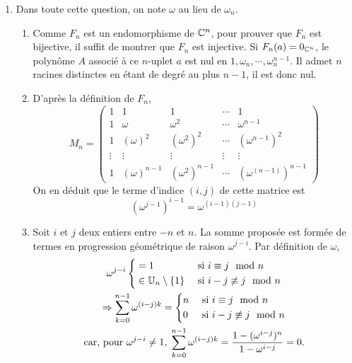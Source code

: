 \begin{enumerate}
 \item Dans toute cette question, on note $\omega$ au lieu de $\omega_n$.
\begin{enumerate}
 \item Comme $F_n$ est un endomorphisme de $\mathbb{C}^n$, pour prouver que $F_n$ est bijective, il suffit de montrer que $F_n$ est injective.\newline
Si $F_n(a)=0_{\mathbb{C}^n}$, le polynôme $A$ associé à ce $n$-uplet $a$ est nul en $1,\omega_n,\cdots,\omega_n^{n-1}$. Il admet $n$ racines distinctes en étant de degré au plus $n-1$, il est donc nul.
 \item D'après la définition de $F_n$,
\begin{displaymath}
 M_n=
\begin{pmatrix}
 1      & 1              & 1                & \cdots & 1                     \\
 1      & \omega         & \omega^2         & \cdots & \omega^{n-1}          \\
 1      & (\omega)^2     & (\omega^2)^2     & \cdots & (\omega^{n-1})^2      \\
 \vdots & \vdots         &  \vdots          & \vdots &  \vdots               \\
 1      & (\omega)^{n-1} & (\omega^2)^{n-1} & \cdots & (\omega^{(n-1)})^{n-1}
\end{pmatrix}
\end{displaymath}
On en déduit que le terme d'indice $(i,j)$ de cette matrice est
\begin{displaymath}
 (\omega^{j-1})^{i-1}=\omega^{(i-1)(j-1)}
\end{displaymath}

 \item Soit $i$ et $j$ deux entiers entre $-n$ et $n$. La somme proposée est formée de termes en progression géométrique de raison $\omega^{j-i}$. Par définition de $\omega$,
\begin{multline*}
 \omega^{j-i}
\left\lbrace 
\begin{aligned}
 &=1& &\text{ si } i\equiv j \mod n\\
 &\in \mathbb{U}_n\setminus\{1\}& &\text{ si } i-j \not \equiv j \mod n
\end{aligned}
\right. \\
\Rightarrow 
\sum_{k=0}^{n-1}\omega^{(i-j)k}=
\left\lbrace
\begin{aligned}
 &n& &\text{ si } i\equiv j \mod n\\
 &0& &\text{ si }  i-j \not \equiv j \mod n
\end{aligned}
\right. \\
\text{car, pour } \omega^{j-i}\neq 1,\;\sum_{k=0}^{n-1}\omega^{(i-j)k}=\frac{1-(\omega^{i-j})^n}{1-\omega^{i-j}}=0.
\end{multline*}


\end{enumerate}
\end{enumerate}
